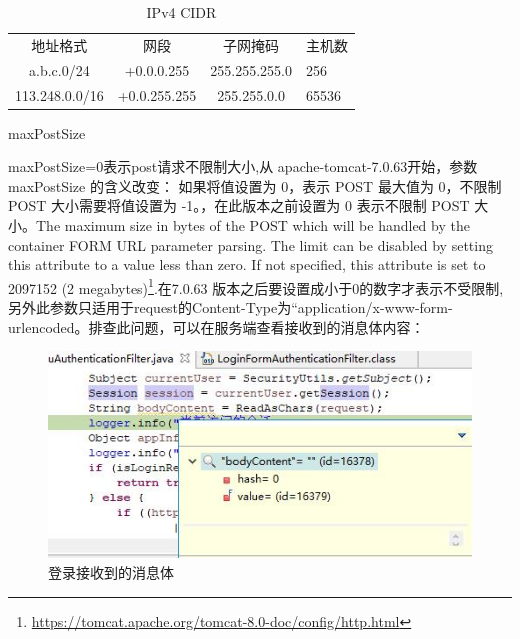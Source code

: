 \documentclass[8pt]{book}
\makeatletter
\numberwithin{dummy}{section}
\theoremstyle{ocrenumbox}
\theoremstyle{blacknumex}
\theoremstyle{blacknumbox}
\theoremstyle{ocrenum}
\renewcommand{\subsection}{\@startsection {subsection}{2}{\z@}
	{-3ex \@plus -0.1ex \@minus -.4ex}
	{0.5ex \@plus.2ex }
	{\normalfont\sffamily\bfseries}}
\makeatother
\begin{document}
\begin{table}[htbp]
	\caption{IPv4 CIDR}
	\label{table:ipv4cidr}
	\begin{center}
		\begin{tabular}{|c|c|c|p{3cm}|}
			\hline
			\multirow{1}{*}{地址格式}
			& \multicolumn{1}{c|}{网段}
			& \multicolumn{1}{c|}{子网掩码} 
			& \multicolumn{1}{c|}{主机数}\\			
			\cline{1-4}
			a.b.c.0/24 & +0.0.0.255 &  255.255.255.0  & 256 \\
			\hline
			113.248.0.0/16 & +0.0.255.255 &  255.255.0.0  & 65536 \\
			\hline							
		\end{tabular}	
	\end{center}
\end{table}

\subsection{maxPostSize}

maxPostSize=0表示post请求不限制大小,从 apache-tomcat-7.0.63开始，参数 maxPostSize 的含义改变： 如果将值设置为 0，表示 POST 最大值为 0，不限制 POST 大小需要将值设置为 -1。，在此版本之前设置为 0 表示不限制 POST 大小。The maximum size in bytes of the POST which will be handled by the container FORM URL parameter parsing. The limit can be disabled by setting this attribute to a value less than zero. If not specified, this attribute is set to 2097152 (2 megabytes)\footnote{\url{https://tomcat.apache.org/tomcat-8.0-doc/config/http.html}}.在7.0.63 版本之后要设置成小于0的数字才表示不受限制,另外此参数只适用于request的Content-Type为“application/x-www-form-urlencoded。排查此问题，可以在服务端查看接收到的消息体内容：

\begin{figure}[htbp]
	\centering
	\includegraphics[scale=0.8]{loginrecievebody.jpg}
	\caption{登录接收到的消息体}
	\label{fig:loginrecievebody}
\end{figure}
\end{document}
